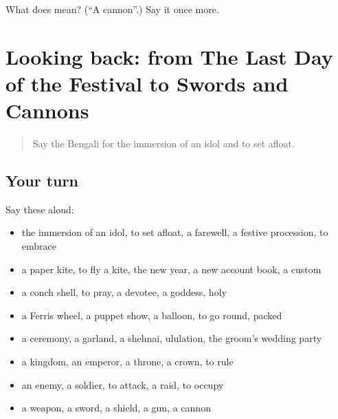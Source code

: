\begin{tcolorbox}[breakable,colback=teal!4,colframe=teal!35!black,title={Before you move on}]
What does  mean? (\textquotedblleft{}A cannon\textquotedblright{}.) Say it once more.
\end{tcolorbox}
\section[(dialogue)]{Looking back: from The Last Day of the Festival to Swords and Cannons}

\label{lesson:BN-R315-review-308-315}



\begin{quote}
Say the Bengali for the immersion of an idol and to set afloat.
\end{quote}

\subsection*{Your turn}
Say these aloud:

\begin{itemize}
\raggedright
  \item the immersion of an idol, to set afloat, a farewell, a festive procession, to embrace
  \item a paper kite, to fly a kite, the new year, a new account book, a custom
  \item a conch shell, to pray, a devotee, a goddess, holy
  \item a Ferris wheel, a puppet show, a balloon, to go round, packed
  \item a ceremony, a garland, a shehnai, ululation, the groom's wedding party
  \item a kingdom, an emperor, a throne, a crown, to rule
  \item an enemy, a soldier, to attack, a raid, to occupy
  \item a weapon, a sword, a shield, a gun, a cannon
\end{itemize}

